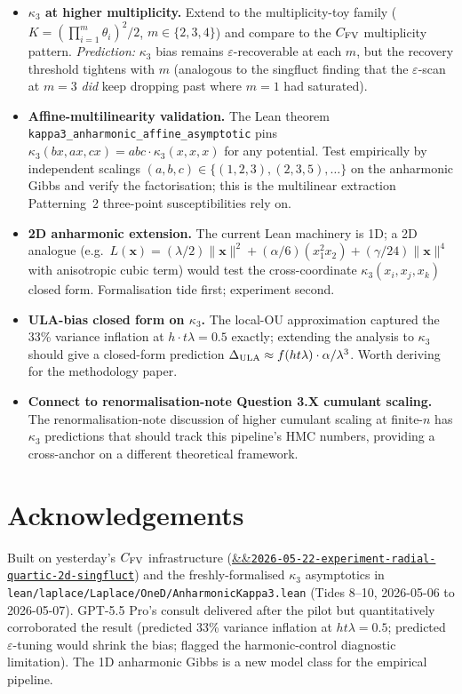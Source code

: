 \documentclass[11pt]{article}
\newcommand{\experimentref}[2][]{\href{https://therisensea.org/experiments/#2/}{\ifx&#1&\texttt{#2}\else#1\fi}}
\begin{document}
\begin{itemize}[noitemsep,leftmargin=*]
  \item \textbf{$\kappa_3$ at higher multiplicity.} Extend to the
    multiplicity-toy family ($K = (\prod_{i=1}^m \theta_i)^2/2$, $m \in
    \{2, 3, 4\}$) and compare to the $C_{\rm FV}$ multiplicity
    pattern. \emph{Prediction:} $\kappa_3$ bias remains
    $\varepsilon$-recoverable at each $m$, but the recovery
    threshold tightens with $m$ (analogous to the singfluct
    finding that the $\varepsilon$-scan at $m = 3$ \emph{did}
    keep dropping past where $m = 1$ had saturated).

  \item \textbf{Affine-multilinearity validation.} The Lean
    theorem \texttt{kappa3\_anharmonic\_affine\_asymptotic} pins
    $\kappa_3(b x, a x, c x) = a b c \cdot \kappa_3(x, x, x)$
    for any potential. Test empirically by independent scalings
    $(a, b, c) \in \{(1, 2, 3), (2, 3, 5), \ldots\}$ on the
    anharmonic Gibbs and verify the factorisation; this is the
    multilinear extraction Patterning~2 three-point
    susceptibilities rely on.

  \item \textbf{2D anharmonic extension.} The current Lean
    machinery is 1D; a 2D analogue (e.g.\ $L(\boldsymbol{x}) =
    (\lambda/2)\|\boldsymbol{x}\|^2 + (\alpha/6)(x_1^2 x_2)
    + (\gamma/24)\|\boldsymbol{x}\|^4$ with anisotropic cubic
    term) would test the cross-coordinate
    $\kappa_3(x_i, x_j, x_k)$ closed form. Formalisation tide
    first; experiment second.

  \item \textbf{ULA-bias closed form on $\kappa_3$.} The local-OU
    approximation captured the 33\% variance inflation at $h
    \cdot t \lambda = 0.5$ exactly; extending the analysis to
    $\kappa_3$ should give a closed-form prediction
    $\Delta_{\rm ULA} \approx f(h t \lambda) \cdot \alpha / \lambda^3$.
    Worth deriving for the methodology paper.

  \item \textbf{Connect to renormalisation-note Question 3.X
    cumulant scaling.} The
    renormalisation-note discussion of higher cumulant scaling at
    finite-$n$ has $\kappa_3$ predictions that should track this
    pipeline's HMC numbers, providing a cross-anchor on a
    different theoretical framework.
\end{itemize}

\section*{Acknowledgements}

Built on yesterday's $C_{\rm FV}$ infrastructure
(\experimentref{2026-05-22-experiment-radial-quartic-2d-singfluct})
and the freshly-formalised $\kappa_3$ asymptotics in
\texttt{lean/laplace/Laplace/OneD/AnharmonicKappa3.lean} (Tides 8--10,
2026-05-06 to 2026-05-07). GPT-5.5 Pro's consult delivered after the
pilot but quantitatively corroborated the result (predicted 33\%
variance inflation at $h t \lambda = 0.5$; predicted $\varepsilon$-tuning
would shrink the bias; flagged the harmonic-control diagnostic
limitation). The 1D anharmonic Gibbs is a new model class for the
empirical pipeline.
\end{document}
